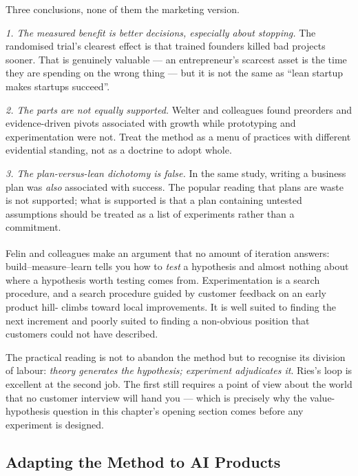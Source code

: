 \begin{engineernote}
Three conclusions, none of them the marketing version.

\emph{1. The measured benefit is better decisions, especially about stopping.}
The randomised trial's clearest effect is that trained founders killed bad
projects sooner. That is genuinely valuable --- an entrepreneur's scarcest
asset is the time they are spending on the wrong thing --- but it is not the
same as ``lean startup makes startups succeed''.

\emph{2. The parts are not equally supported.} Welter and colleagues found
preorders and evidence-driven pivots associated with growth while prototyping
and experimentation were not. Treat the method as a menu of practices with
different evidential standing, not as a doctrine to adopt whole.

\emph{3. The plan-versus-lean dichotomy is false.} In the same study, writing
a business plan was \emph{also} associated with success. The popular reading
that plans are waste is not supported; what is supported is that a plan
containing untested assumptions should be treated as a list of experiments
rather than a commitment.
\end{engineernote}

\begin{cautionbox}
Felin and colleagues make an argument that no amount of iteration
answers\textsuperscript{\cite{felinLeanStartupBusiness2020}}: build--measure--learn
tells you how to \emph{test} a hypothesis and almost nothing about where a
hypothesis worth testing comes from. Experimentation is a search procedure,
and a search procedure guided by customer feedback on an early product hill-
climbs toward local improvements. It is well suited to finding the next
increment and poorly suited to finding a non-obvious position that customers
could not have described.

The practical reading is not to abandon the method but to recognise its
division of labour: \emph{theory generates the hypothesis; experiment
adjudicates it}. Ries's loop is excellent at the second job. The first still
requires a point of view about the world that no customer interview will hand
you --- which is precisely why the value-hypothesis question in this chapter's
opening section comes before any experiment is designed.
\end{cautionbox}

\subsection{Adapting the Method to AI Products}

